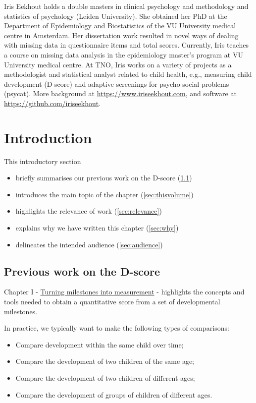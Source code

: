 \documentclass[
]{book}
\providecommand{\tightlist}{%
  \setlength{\itemsep}{0pt}\setlength{\parskip}{0pt}}
\begin{document}
Iris Eekhout holds a double masters in clinical psychology and methodology and statistics of psychology (Leiden University). She obtained her PhD at the Department of Epidemiology and Biostatistics of the VU University medical centre in Amsterdam. Her dissertation work resulted in novel ways of dealing with missing data in questionnaire items and total scores. Currently, Iris teaches a course on missing data analysis in the epidemiology master's program at VU University medical centre. At TNO, Iris works on a variety of projects as a methodologist and statistical analyst related to child health, e.g., measuring child development (D-score) and adaptive screenings for psycho-social problems (psycat). More background at \url{https://www.iriseekhout.com}, and software at \url{https://github.com/iriseekhout}.

\hypertarget{ch:introduction2}{%
\chapter{Introduction}\label{ch:introduction2}}

This introductory section

\begin{itemize}
\tightlist
\item
  briefly summarises our previous work on the D-score (\ref{sec:previous})
\item
  introduces the main topic of the chapter (\ref{sec:thisvolume})
\item
  highlights the relevance of work (\ref{sec:relevance})
\item
  explains why we have written this chapter (\ref{sec:why})
\item
  delineates the intended audience (\ref{sec:audience})
\end{itemize}

\hypertarget{sec:previous}{%
\section{Previous work on the D-score}\label{sec:previous}}

Chapter I - \href{https://d-score.org/dbook1}{Turning milestones into measurement} - highlights the concepts and tools needed to obtain a quantitative score from a set of developmental milestones.

In practice, we typically want to make the following types of comparisons:

\begin{itemize}
\tightlist
\item
  Compare development within the same child over time;
\item
  Compare the development of two children of the same age;
\item
  Compare the development of two children of different ages;
\item
  Compare the development of groups of children of different ages.
\end{itemize}
\end{document}
